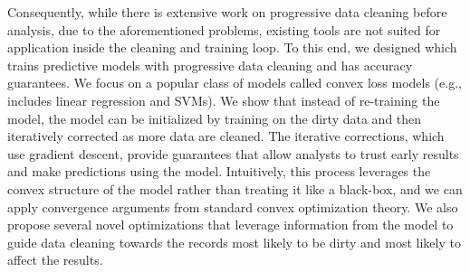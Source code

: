 Consequently, while there is extensive work on progressive data cleaning before analysis, due to the aforementioned problems, existing tools are not suited for application inside the cleaning and training loop.  
To this end, we designed \sys which trains predictive models with progressive data cleaning and has accuracy guarantees.
We focus on a popular class of models called convex loss models (e.g., includes linear regression and SVMs).
We show that instead of re-training the model, the model can be initialized by training on the dirty data and then iteratively corrected as more data are cleaned.
The iterative corrections, which use gradient descent, provide guarantees that allow analysts to trust early results and make predictions using the model.
Intuitively, this process leverages the convex structure of the model rather than treating it like a black-box, and we can apply convergence arguments from standard convex optimization theory.
We also propose several novel optimizations that leverage information from the model to guide data cleaning towards the records most likely to be dirty and most likely to affect the results.








